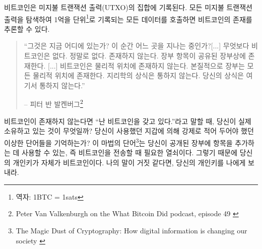 비트코인은 미지불 트랜잭션 출력(UTXO)의 집합에 기록된다.
모든 미지불 트랜잭션 출력을 탐색하여 1억을 단위\footnote{역자: 1BTC = 1sats}로 기록되는 모든 데이터를 호출하면 비트코인의 존재를 추론할 수 있다.

\begin{quotation}\begin{samepage}
		\enquote{그것은 지금 어디에 있는가? 이 순간 어느 곳을 지나는 중인가?[...] 무엇보다 비트코인은
			없다. 정말로 없다. 존재하지 않는다. 장부 항목이 공유된 장부상에 존재한다. [...] 
			비트코인은 물리적 위치에 존재하지 않는다. 본질적으로 장부는 모든 물리적 위치에 존재한다.
			지리학의 상식은 통하지 않는다. 당신의 상식은 여기서 통하지 않는다.}
		\begin{flushright} -- 피터 반 발켄버그\footnote{Peter Van Valkenburgh on the What Bitcoin Did podcast, episode 49 \cite{wbd049}}
\end{flushright}\end{samepage}\end{quotation}

비트코인이 존재하지 않는다면 \enquote{난 비트코인을 갖고 있다.}라고 말할 때, 당신이 실제
소유하고 있는 것이 무엇일까? 당신이 사용했던 지갑에 의해 강제로 적어 두어야 했던 이상한 단어들을 기억하는가?
이 마법의 단어\footnote{The Magic Dust of Cryptography: How digital
	information is changing our society \cite{gigi:magic-spell}}는 당신이 공개된 장부에 항목을 추가하는 데
사용할 수 있는, 즉 비트코인을 전송할 때 필요한 열쇠이다. 그렇기 때문에 당신의 개인키가 자체가 비트코인이다. 나의 
말이 거짓 같다면, 당신의 개인키를 나에게 보내라. 

